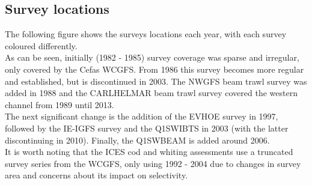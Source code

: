 \documentclass[12pt]{article}\usepackage[]{graphicx}\usepackage[]{color}
\begin{document}
\subsection{Survey locations}

The following figure shows the surveys locations each year, with each survey
coloured differently.\\

As can be seen, initially (1982 - 1985) survey coverage was sparse and
irregular, only covered by the Cefas WCGFS. From 1986 this survey becomes more
regular and established, but is discontinued in 2003. The NWGFS beam trawl
survey was added in 1988 and the CARLHELMAR beam trawl survey covered the
western channel from 1989 until 2013.\\

The next significant change is the addition of the EVHOE survey in 1997,
followed by the IE-IGFS survey and the Q1SWIBTS in 2003 (with the latter
discontinuing in 2010). Finally, the Q1SWBEAM is added around 2006. \\

It is worth noting that the ICES cod and whiting assessments use a truncated
survey series from the WCGFS, only using 1992 - 2004 due to changes in survey
area and concerns about its impact on selectivity. \\
\end{document}

